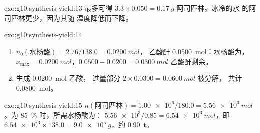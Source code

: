 \begin{solution}{exo:g10:synthesis-yield:13}
最多可得 $3.3 \times 0.050 = \qty{0.17}{g}$ 阿司匹林。冰冷的水
的阿司匹林更少，因为其随
温度降低而下降。
\end{solution}

\begin{solution}{exo:g10:synthesis-yield:14}
\begin{enumerate}
  \item $n_0(\text{水杨酸}) = 2.76 / 138.0 = \qty{0.0200}{mol}$，
        乙酸酐 \qty{0.0500}{mol}：水杨酸为，
        $x_{\max} = \qty{0.0200}{mol}$，$0.0500 - 0.0200 =
        \qty{0.0300}{mol}$ 乙酸酐剩余。
  \item {}生成 \qty{0.0200}{mol} 乙酸，
        过量部分 $2 \times 0.0300 = \qty{0.0600}{mol}$ 被分解，
        共计 \qty{0.0800}{mol}。
\end{enumerate}
\end{solution}

\begin{solution}{exo:g10:synthesis-yield:15}
$n(\text{阿司匹林}) = \num{1.00e6} / 180.0 = \qty{5.56e3}{mol}$。为
\qty{85}{\percent} 时，所需水杨酸为：
$\num{5.56e3} / 0.85 = \qty{6.54e3}{mol}$，即
$\num{6.54e3} \times 138.0 = \qty{9.0e5}{g}$，约 \qty{0.90}{t}。
\end{solution}

